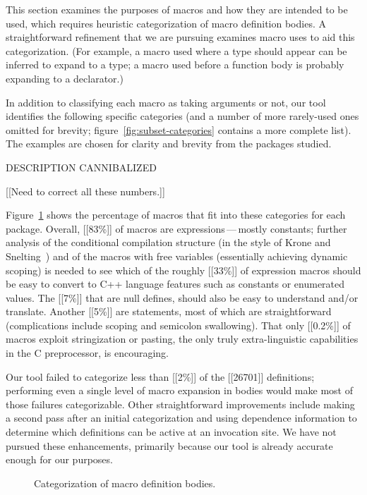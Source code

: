 \documentclass[11pt]{article}
\begin{document}
This section examines the purposes of macros and how they are intended to
be used, which requires heuristic categorization of macro definition bodies.  A
straightforward refinement that we are pursuing examines macro uses to aid
this categorization.  (For example, a macro used where a type should appear
can be inferred to expand to a type; a macro used before a function body is
probably expanding to a declarator.)

In addition to classifying each macro as taking arguments or not, our tool
identifies the following specific categories (and a number of more
rarely-used ones omitted for brevity;
figure~\ref{fig:subset-categories} contains a more complete list).  The examples
are chosen for clarity and brevity from the packages studied.

DESCRIPTION CANNIBALIZED

[[Need to correct all these numbers.]]

Figure~\ref{fig:categorization} shows the percentage of macros that fit
into these categories for each package.  Overall, [[83\%]] of macros are
expressions\,---\,mostly constants; further analysis of the conditional
compilation structure (in the style of Krone and Snelting~\cite{Krone94})
and of the macros with free variables (essentially achieving dynamic
scoping) is needed to see which of the roughly [[33\%]] of expression macros
should be easy to convert to C++ language features such as constants or
enumerated values.  The [[7\%]] that are null
defines, should also be easy to understand and/or translate.  Another [[5\%]]
are statements, most of which are straightforward (complications include
scoping and semicolon swallowing).  That only [[0.2\%]] of macros exploit
stringization or pasting, the only truly extra-linguistic capabilities in
the C preprocessor, is encouraging.

Our tool failed to categorize less than [[2\%]] of the [[26701]] definitions;
performing even a single level of macro expansion in bodies would make most
of those failures categorizable.  Other straightforward improvements
include making a second pass after an initial categorization and using
dependence information to determine which definitions can be active at an
invocation site.  We have not pursued these enhancements, primarily because
our tool is already accurate enough for our purposes.


\begin{figure}
\centerline{}
\caption{Categorization of macro definition bodies.}
\label{fig:categorization}
\end{figure}
\end{document}
